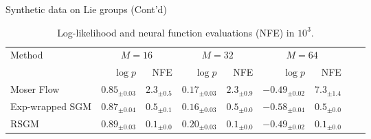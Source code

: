    
   \begin{frame}{Synthetic data on Lie groups (Cont'd)}
   
   \begin{table}[t]
       \setlength\tabcolsep{5pt}
       \centering
       \small
       \begin{tabular}{lrrrrrrrr}
       \toprule
       \multirow{2}{4.5em}{Method} & \multicolumn{2}{c}{$M=16$} & \multicolumn{2}{c}{$M=32$} &\multicolumn{2}{c}{$M=64$} \\ \cmidrule(lr){2-3} \cmidrule(lr){4-5} \cmidrule(lr){6-7}
       & $\log p$ & NFE & $\log p$ & NFE & $\log p$ & NFE\\
        
       \midrule
   Moser Flow & ${0.85_{\pm 0.03}}$ & ${2.3_{\pm 0.5}}$ & ${0.17_{\pm 0.03}}$ & ${2.3_{\pm 0.9}}$ & $\mathbf{-0.49_{\pm 0.02}}$ & ${7.3_{\pm 1.4}}$ \\
   Exp-wrapped SGM & $\mathbf{0.87_{\pm 0.04}}$ & ${0.5_{\pm 0.1}}$ & ${0.16_{\pm 0.03}}$ & ${0.5_{\pm 0.0}}$ & ${-0.58_{\pm 0.04}}$ & ${0.5_{\pm 0.0}}$ \\
   RSGM & $\mathbf{0.89_{\pm 0.03}}$ & $\mathbf{0.1_{\pm 0.0}}$ & $\mathbf{0.20_{\pm 0.03}}$ & $\mathbf{0.1_{\pm 0.0}}$ & $\mathbf{-0.49_{\pm 0.02}}$ & $\mathbf{0.1_{\pm 0.0}}$ \\
   
       \bottomrule
       \end{tabular}
       \caption{
       Log-likelihood and neural function evaluations (NFE) in $10^3$.
       } 
       \label{tab:so3}
   \end{table}
   \end{frame}
   
